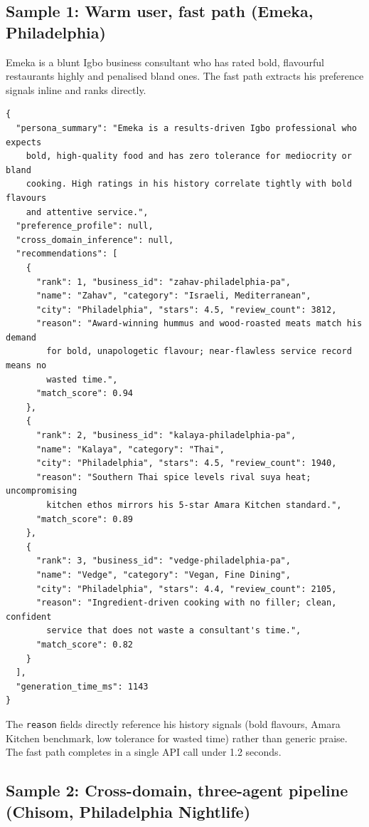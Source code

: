 \documentclass[11pt]{article}
\begin{document}
\subsection{Sample 1: Warm user, fast path (Emeka, Philadelphia)}

Emeka is a blunt Igbo business consultant who has rated bold, flavourful restaurants highly and penalised bland ones. The fast path extracts his preference signals inline and ranks directly.

{\footnotesize\begin{verbatim}
{
  "persona_summary": "Emeka is a results-driven Igbo professional who expects
    bold, high-quality food and has zero tolerance for mediocrity or bland
    cooking. High ratings in his history correlate tightly with bold flavours
    and attentive service.",
  "preference_profile": null,
  "cross_domain_inference": null,
  "recommendations": [
    {
      "rank": 1, "business_id": "zahav-philadelphia-pa",
      "name": "Zahav", "category": "Israeli, Mediterranean",
      "city": "Philadelphia", "stars": 4.5, "review_count": 3812,
      "reason": "Award-winning hummus and wood-roasted meats match his demand
        for bold, unapologetic flavour; near-flawless service record means no
        wasted time.",
      "match_score": 0.94
    },
    {
      "rank": 2, "business_id": "kalaya-philadelphia-pa",
      "name": "Kalaya", "category": "Thai",
      "city": "Philadelphia", "stars": 4.5, "review_count": 1940,
      "reason": "Southern Thai spice levels rival suya heat; uncompromising
        kitchen ethos mirrors his 5-star Amara Kitchen standard.",
      "match_score": 0.89
    },
    {
      "rank": 3, "business_id": "vedge-philadelphia-pa",
      "name": "Vedge", "category": "Vegan, Fine Dining",
      "city": "Philadelphia", "stars": 4.4, "review_count": 2105,
      "reason": "Ingredient-driven cooking with no filler; clean, confident
        service that does not waste a consultant's time.",
      "match_score": 0.82
    }
  ],
  "generation_time_ms": 1143
}
\end{verbatim}}

The \texttt{reason} fields directly reference his history signals (bold flavours, Amara Kitchen benchmark, low tolerance for wasted time) rather than generic praise. The fast path completes in a single API call under 1.2 seconds.

\subsection{Sample 2: Cross-domain, three-agent pipeline (Chisom, Philadelphia Nightlife)}
\end{document}
